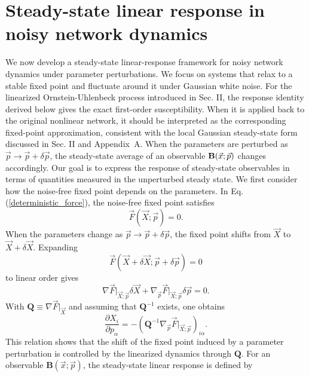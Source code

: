 \section{Steady-state linear response in noisy network dynamics}
We now develop a steady-state linear-response framework for noisy network dynamics under parameter perturbations. We focus on systems that relax to a stable fixed point and fluctuate around it under Gaussian white noise. For the linearized Ornstein-Uhlenbeck process introduced in Sec. II, the response identity derived below gives the exact first-order susceptibility. When it is applied back to the original nonlinear network, it should be interpreted as the corresponding fixed-point approximation, consistent with the local Gaussian steady-state form discussed in Sec. II and Appendix~A. When the parameters are perturbed as $\vec{p} \rightarrow \vec{p} + \delta \vec{p}$, the steady-state average of an observable ${\bf B}(\vec{x}; \vec{p})$ changes accordingly. Our goal is to express the response of steady-state observables in terms of quantities measured in the unperturbed steady state. We first consider how the noise-free fixed point depends on the parameters. In Eq. (\ref{deterministic_force}), the noise-free fixed point satisfies
\begin{equation}
    \vec{F}(\vec{X}; \vec{p}) = 0.
\end{equation}
When the parameters change as $\vec{p} \rightarrow \vec{p} + \delta \vec{p}$, the fixed point shifts from $\vec{X}$ to $\vec{X}+\delta \vec{X}$. Expanding
\begin{equation}
    \vec{F}(\vec{X}+\delta \vec{X}; \vec{p}+ \delta \vec{p}) = 0
\end{equation}
to linear order gives
\begin{equation}
    \nabla \vec{F}\big|_{\vec{X}; \vec{p}} \delta \vec{X} + \nabla_{\vec{p}}\vec{F}\big|_{\vec{X}; \vec{p}} \delta \vec {p} = 0.
\end{equation}
With $\mathbf{Q}\equiv\nabla\vec{F}\big|_{\vec{X}}$ and assuming that $\mathbf{Q}^{-1}$ exists, one obtains
\begin{equation}
    \frac{\partial X_i}{\partial p_\alpha} = -\left(\mathbf{Q}^{-1} \nabla_{\vec{p}} \vec{F}\big|_{\vec{X}; \vec{p}}\right)_{i\alpha}.
\end{equation}
This relation shows that the shift of the fixed point induced by a parameter perturbation is controlled by the linearized dynamics through $\mathbf{Q}$. For an observable $\mathbf{B}(\vec{x}; \vec{p})$, the steady-state linear response is defined by
